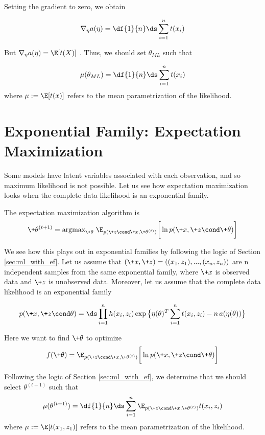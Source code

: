 \documentclass{article} %
\begin{document}
Setting the gradient to zero, we obtain

\[ \nabla_\eta a(\eta) = \df{1}{n}  \ds\sum_{i=1}^n t(x_i) \]

But $\nabla_\eta a(\eta) = \E [t(X)]$ \cite{jordan_ef}.  Thus, we should set $\theta_{ML}$ such that

\[ \mu(\theta_{ML}) = \df{1}{n} \ds\sum_{i=1}^n t(x_i) \]
where $\mu := \E[t(x)]$ refers to the mean parametrization of the likelihood. 

 \section{Exponential Family: Expectation Maximization} \label{sec:em_with_ef}

Some models have latent variables associated with each observation, and so maximum likelihood is not possible.  Let us see how expectation maximization looks when the complete data likelihood is an exponential family.

The expectation maximization algorithm is 
\begin{equation}
\label{eqn:em_algorithm_appendix}
 \+\theta^{(t+1)} =  \text{argmax}_{\+\theta} \; \E_{p(\+z \cond \+x , \+\theta^{(t)})} \bigg[ \ln p(\+x, \+z \cond \+\theta) \bigg] 
 \end{equation}

We see how this plays out in exponential families by following the logic of Section \ref{sec:ml_with_ef}.   Let us assume that $(\+x, \+z)=((x_1,z_1), ..., (x_n, z_n))$ are n independent samples from the same exponential family, where $\+x$ is observed data and $\+z$ is unobserved data.
Moreover, let us assume that the complete data likelihood is an exponential family

\begin{align}
\label{eqn:exponential_family_complete_data_likelihood}
 p(\+x, \+z \cond \theta) = \ds\prod_{i=1}^n h(x_i, z_i) \exp \big\{ \eta(\theta)^T \sum_{i=1}^n t(x_i, z_i) - n \,a(\eta(\theta))\big\} 
 \end{align}

Here we want to find $\+\theta$ to optimize 
\[ f(\+\theta) =  \E_{p(\+z \cond \+x , \+\theta^{(t)})} \bigg[ \ln p(\+x, \+z \cond \+\theta) \bigg] \]

Following the logic of Section \ref{sec:ml_with_ef}, we determine that we should select $\theta^{(t+1)}$ such that
\[ \mu(\theta^{(t+1)}) = \df{1}{n} \ds\sum_{i=1}^n   \E_{p(\+z \cond \+x , \+\theta^{(t)})} t(x_i, z_i) \]
where $\mu := \E[t(x_1,z_1)]$ refers to the mean parametrization of the likelihood.
\end{document}

